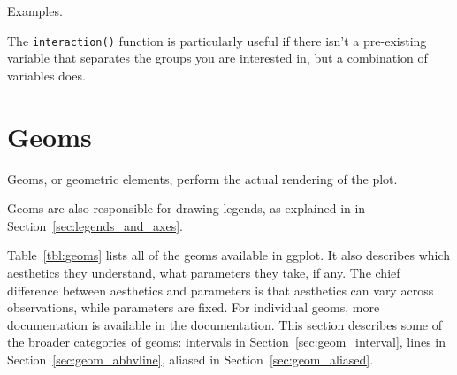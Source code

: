 % 
% 
Examples.



The {\tt interaction()} function is particularly useful if there isn't a pre-existing variable that separates the groups you are interested in, but a combination of variables does.  

\section{Geoms}
\label{sec:geom}


Geoms, or geometric elements, perform the actual rendering of the plot.

Geoms are also responsible for drawing legends, as explained in in Section~\ref{sec:legends_and_axes}.

Table~\ref{tbl:geoms} lists all of the geoms available in ggplot.  It also describes which aesthetics they understand, what parameters they take, if any.  The chief difference between aesthetics and parameters is that aesthetics can vary across observations, while parameters are fixed.  For individual geoms, more documentation is available in the documentation.  This section describes some of the broader categories of geoms: intervals in Section~\ref{sec:geom_interval}, lines in Section~\ref{sec:geom_abhvline}, aliased in Section~\ref{sec:geom_aliased}.

